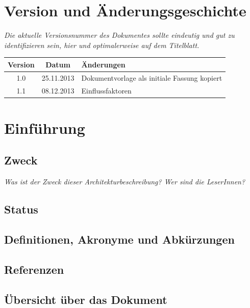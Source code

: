 \documentclass[fontsize=12pt,paper=a4,twoside]{scrartcl}
\begin{document}
\listoftables

\clearpage

\section*{Version und Änderungsgeschichte}

{\em Die aktuelle Versionsnummer des Dokumentes sollte eindeutig und gut zu
identifizieren sein, hier und optimalerweise auf dem Titelblatt.}

\begin{tabular}{ccl}
Version & Datum & Änderungen \\
\hline
1.0 & 25.11.2013 & Dokumentvorlage als initiale Fassung kopiert \\
1.1 & 08.12.2013 & Einflussfaktoren \\
\end{tabular}


\section{Einführung}

\subsection{Zweck}

  {\em Was ist der Zweck dieser Architekturbeschreibung? Wer sind
  die LeserInnen?}

\subsection{Status}


  
\subsection{Definitionen, Akronyme und Abkürzungen}


\subsection{Referenzen}

\subsection{Übersicht über das Dokument}
\end{document}
